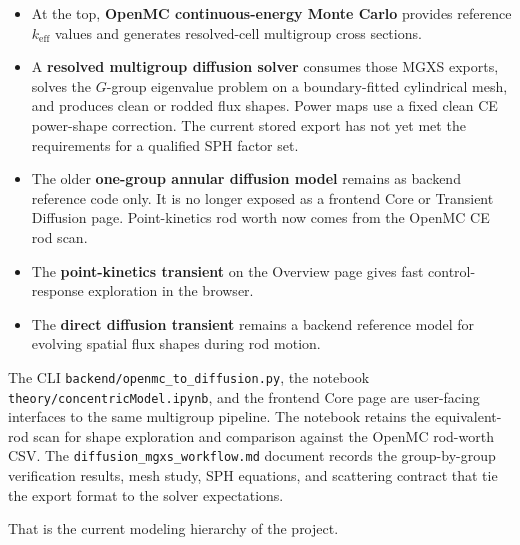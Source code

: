 \documentclass[11pt]{article}
\begin{document}
\begin{itemize}
  \item At the top, \textbf{OpenMC continuous-energy Monte Carlo} provides
        reference $k_{\mathrm{eff}}$ values and generates resolved-cell
        multigroup cross sections.
  \item A \textbf{resolved multigroup diffusion solver} consumes those MGXS
        exports, solves the $G$-group eigenvalue problem on a
        boundary-fitted cylindrical mesh, and produces clean or rodded flux
        shapes.  Power maps use a fixed clean CE power-shape correction.  The
        current stored export has not yet met the requirements for a qualified
        SPH factor set.
  \item The older \textbf{one-group annular diffusion model} remains as
        backend reference code only.  It is no longer exposed as a frontend
        Core or Transient Diffusion page.  Point-kinetics rod worth now comes
        from the OpenMC CE rod scan.
  \item The \textbf{point-kinetics transient} on the Overview page gives
        fast control-response exploration in the browser.
  \item The \textbf{direct diffusion transient} remains a backend reference
        model for evolving spatial flux shapes during rod motion.
\end{itemize}

The CLI \texttt{backend/openmc\_to\_diffusion.py}, the notebook
\texttt{theory/concentricModel.ipynb}, and the frontend Core page
are user-facing interfaces to the same multigroup pipeline.  The notebook
retains the equivalent-rod scan for shape exploration and comparison against
the OpenMC rod-worth CSV.  The
\texttt{diffusion\_mgxs\_workflow.md} document records the group-by-group
verification results, mesh study, SPH equations, and scattering contract that
tie the export format to the solver expectations.

That is the current modeling hierarchy of the project.
\end{document}
